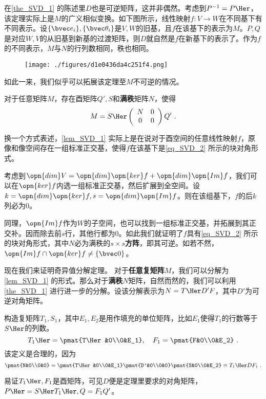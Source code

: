 在\autoref{the_SVD_1} 的陈述里$D$也是可逆矩阵，这并非偶然。考虑到$P^{-1}=P\Her $，该定理实际上是$M$的广义相似变换。如下图所示，线性映射$f:V\rightarrow W$在不同基下有不同表示。设$\{\bvec e_i\},\{\bvec \theta_i\}$是$V,W$的旧基，且$f$在该基下的表示为$M$。$P,Q$是对应$W,V$的从旧基到新基的过渡矩阵，则$D$就自然是$f$在新基下的表示了。作为$f$的不同表示，$M$与$N$的行列数相同，秩也相同。
\begin{figure}[ht]
\centering
\texttt{[image: ./figures/d1e0436da4c251f4.png]}
\caption{} \label{fig_SVD_2}
\end{figure}
如此一来，我们似乎可以拓展该定理至$M$不可逆的情况。

\begin{lemma}{}\label{lem_SVD_1}
对于任意矩阵$M$，存在酉矩阵$Q',S$和\textbf{满秩}矩阵$N$，使得
\begin{equation}\label{eq_SVD_2}
M=S\Her \left(\begin{array}{cc}
N & 0 \\
0 & 0
\end{array}\right) Q'~.
\end{equation}
\end{lemma}


换一个方式表述，\autoref{lem_SVD_1} 实际上是在说对于酉空间的任意线性映射$f$，原像和像空间存在一组标准正交基，使得$f$在该基下是\autoref{eq_SVD_2} 所示的块对角形式。

考虑到$\opn{dim}V=\opn{dim}\opn{ker}f+\opn{dim}\opn{Im}f$，我们可以在$\opn{ker}f$内选一组标准正交基，然后扩展到全空间。设$k=\opn{dim}\opn{ker}f,s=\opn{dim}\opn{Im}f$。则在该组基下，$f$的后$k$列必为$0$。

同理，$\opn{Im}f$作为$W$的子空间，也可以找到一组标准正交基，并拓展到其正交补。因而除去前$s$行，其他行都为$0$。如此我们就证明了$f$具有\autoref{eq_SVD_2} 所示的块对角形式，其中$N$必为满秩的$s\times s$\textbf{方阵}，即其可逆。如若不然，$\opn{Im}f\cap\opn{ker}f\neq\{\bvec 0\}$。

现在我们来证明奇异值分解定理。
对于\textbf{任意复矩阵}$M$，我们可以分解为\autoref{lem_SVD_1} 的形式。那么对于\textbf{满秩}$N$矩阵，自然而然的，我们可以利用\autoref{the_SVD_1} 进行进一步的分解。设该分解表示为$N=T\Her D'F$，其中$D'$为可逆对角矩阵。

构造复矩阵$T_1,S_1$，其中$E_1,E_2$是用作填充的单位矩阵，比如$E_1$使得$T_1$的行数等于$S\Her $的列数。
\begin{equation}
T_1\Her =\pmat{T\Her &0\\0&E_1},\quad F_1=\pmat{F&0\\0&E_2}
~.
\end{equation}
该定义是合理的，因为
\begin{equation}
\pmat{N&0\\0&0}=\pmat{T\Her &0\\0&E_1}\pmat{D'&0\\0&0}\pmat{S&0\\0&E_2}\equiv T_1\Her DF_1~.
\end{equation}

易证$T_1\Her ,F_1$是酉矩阵，可见$D$便是定理里要求的对角矩阵，$P\Her =S\Her T_1\Her ,Q=F_1Q'$。
